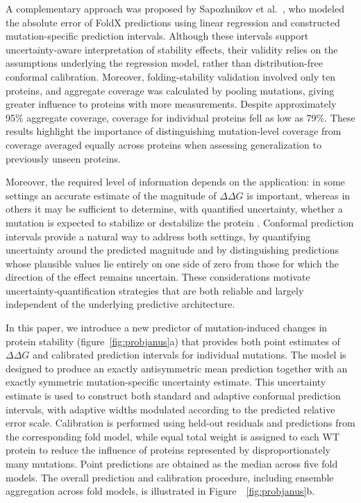 \documentclass[11pt]{article}
\begin{document}
A complementary approach was proposed by Sapozhnikov et al.~\cite{sapozhnikov2023statistical}, who modeled the absolute error of FoldX predictions using linear regression and constructed mutation-specific prediction intervals. Although these intervals support uncertainty-aware interpretation of stability effects, their validity relies on the assumptions underlying the regression model, rather than distribution-free conformal calibration. Moreover, folding-stability validation involved only ten proteins, and aggregate coverage was calculated by pooling mutations, giving greater influence to proteins with more measurements. Despite approximately 95\% aggregate coverage, coverage for individual proteins fell as low as 79\%. These results highlight the importance of distinguishing mutation-level coverage from coverage averaged equally across proteins when assessing generalization to previously unseen proteins.

Moreover, the required level of information depends on the application: in some settings an accurate estimate of the magnitude of \(\Delta\Delta G\) is important, whereas in others it may be sufficient to determine, with quantified uncertainty, whether a mutation is expected to stabilize or destabilize the protein \cite{pancotti2022predicting}. Conformal prediction intervals provide a natural way to address both settings, by quantifying uncertainty around the predicted magnitude and by distinguishing predictions whose plausible values lie entirely on one side of zero from those for which the direction of the effect remains uncertain. These considerations motivate uncertainty-quantification strategies that are both reliable and largely independent of the underlying predictive architecture\cite{romano2019conformalized}\cite{zhou2025conformal}\cite{angelopoulos2024theoretical}.

In this paper, we introduce a new predictor of mutation-induced changes in protein stability (figure~\ref{fig:probjanus}a) that provides both point estimates of \(\Delta\Delta G\) and calibrated prediction intervals for individual mutations. The model is designed to produce an exactly antisymmetric mean prediction together with an exactly symmetric mutation-specific uncertainty estimate. This uncertainty estimate is used to construct both standard and adaptive conformal prediction intervals, with adaptive widths modulated according to the predicted relative error scale. Calibration is performed using held-out residuals and predictions from the corresponding fold model, while equal total weight is assigned to each WT protein to reduce the influence of proteins represented by disproportionately many mutations. Point predictions are obtained as the median across five fold models. The overall prediction and calibration procedure, including ensemble aggregation across fold models, is illustrated in Figure~~\ref{fig:probjanus}b.
\end{document}
